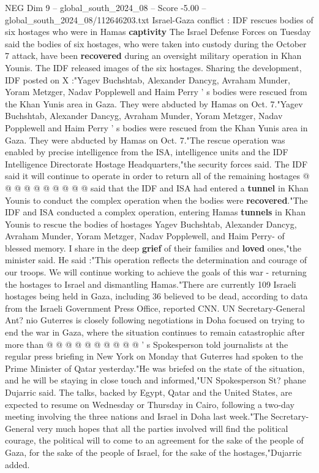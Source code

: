 \begin{textsample}{NEG Dim 9 – global\_south\_2024\_08 – Score -5.00 – global\_south\_2024\_08/112646203.txt}  \label{ex:f9_neg_382}
Israel-Gaza conflict : IDF rescues bodies of six hostages who were in Hamas \textbf{captivity} The Israel Defense Forces on Tuesday said the bodies of six hostages, who were taken into custody during the October 7 attack, have been \textbf{recovered} during an oversight military operation in Khan Younis.
The IDF released images of the six hostages.
Sharing the development, IDF posted on X :"Yagev Buchshtab, Alexander Dancyg, Avraham Munder, Yoram Metzger, Nadav Popplewell and Haim Perry ' s bodies were rescued from the Khan Yunis area in Gaza.
They were abducted by Hamas on Oct. 7."Yagev Buchshtab, Alexander Dancyg, Avraham Munder, Yoram Metzger, Nadav Popplewell and Haim Perry ' s bodies were rescued from the Khan Yunis area in Gaza.
They were abducted by Hamas on Oct. 7."The rescue operation was enabled by precise intelligence from the ISA, intelligence units and the IDF Intelligence Directorate Hostage Headquarters,"the security forces said.
The IDF said it will continue to operate in order to return all of the remaining hostages @ @ @ @ @ @ @ @ @ @ said that the IDF and ISA had entered a \textbf{tunnel} in Khan Younis to conduct the complex operation when the bodies were \textbf{recovered}."The IDF and ISA conducted a complex operation, entering Hamas \textbf{tunnels} in Khan Younis to rescue the bodies of hostages Yagev Buchshtab, Alexander Dancyg, Avraham Munder, Yoram Metzger, Nadav Popplewell, and Haim Perry- of blessed memory.
I share in the deep \textbf{grief} of their families and \textbf{loved} ones,"the minister said.
He said :"This operation reflects the determination and courage of our troops.
We will continue working to achieve the goals of this war - returning the hostages to Israel and dismantling Hamas."There are currently 109 Israeli hostages being held in Gaza, including 36 believed to be dead, according to data from the Israeli Government Press Office, reported CNN.
UN Secretary-General Ant? nio Guterres is closely following negotiations in Doha focused on trying to end the war in Gaza, where the situation continues to remain catastrophic after more than @ @ @ @ @ @ @ @ @ @ ' s Spokesperson told journalists at the regular press briefing in New York on Monday that Guterres had spoken to the Prime Minister of Qatar yesterday."He was briefed on the state of the situation, and he will be staying in close touch and informed,"UN Spokesperson St? phane Dujarric said.
The talks, backed by Egypt, Qatar and the United States, are expected to resume on Wednesday or Thursday in Cairo, following a two-day meeting involving the three nations and Israel in Doha last week."The Secretary-General very much hopes that all the parties involved will find the political courage, the political will to come to an agreement for the sake of the people of Gaza, for the sake of the people of Israel, for the sake of the hostages,"Dujarric added.

\end{textsample}
